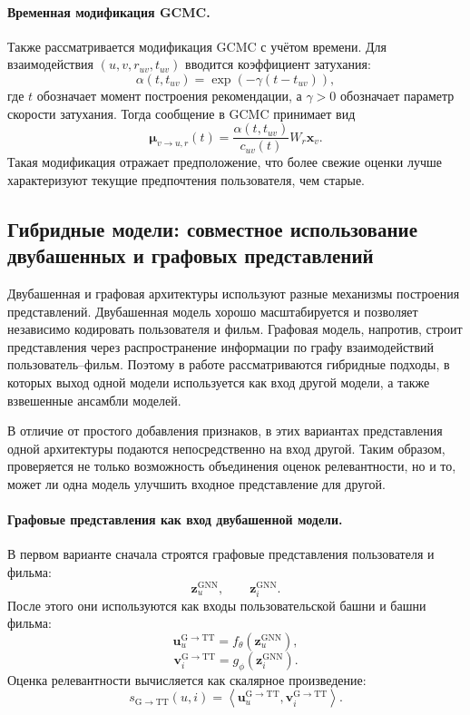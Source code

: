 \documentclass[12pt,fleqn]{article}
\begin{document}
\paragraph{Временная модификация GCMC.}

Также рассматривается модификация GCMC с учётом времени. Для взаимодействия
$(u,v,r_{uv},t_{uv})$ вводится коэффициент затухания:
$$
    \alpha(t,t_{uv})=
    \exp\left(
        -\gamma(t-t_{uv})
    \right),
$$
где $t$ обозначает момент построения рекомендации, а $\gamma>0$ обозначает
параметр скорости затухания. Тогда сообщение в GCMC принимает вид
$$
    \boldsymbol{\mu}_{v\to u,r}(t)=
    \frac{
        \alpha(t,t_{uv})
    }{
        c_{uv}(t)
    }
    W_r\mathbf{x}_v.
$$
Такая модификация отражает предположение, что более свежие оценки лучше
характеризуют текущие предпочтения пользователя, чем старые.

\subsection{Гибридные модели: совместное использование двубашенных и графовых представлений}

Двубашенная и графовая архитектуры используют разные механизмы построения
представлений. Двубашенная модель хорошо масштабируется и позволяет независимо
кодировать пользователя и фильм. Графовая модель, напротив, строит
представления через распространение информации по графу взаимодействий
пользователь--фильм. Поэтому в работе рассматриваются гибридные подходы, в
которых выход одной модели используется как вход другой модели, а также взвешенные ансамбли моделей.

В отличие от простого добавления признаков, в этих вариантах представления
одной архитектуры подаются непосредственно на вход другой. Таким образом,
проверяется не только возможность объединения оценок релевантности, но и то, может ли одна
модель улучшить входное представление для другой.

\paragraph{Графовые представления как вход двубашенной модели.}

В первом варианте сначала строятся графовые представления пользователя и фильма:
$$
    \mathbf{z}^{\mathrm{GNN}}_u,
    \qquad
    \mathbf{z}^{\mathrm{GNN}}_i.
$$
После этого они используются как входы пользовательской башни и башни фильма:
$$
    \mathbf{u}^{\mathrm{G\to TT}}_u=
    f_{\theta}
    \left(
        \mathbf{z}^{\mathrm{GNN}}_u
    \right),
$$
$$
    \mathbf{v}^{\mathrm{G\to TT}}_i=
    g_{\phi}
    \left(
        \mathbf{z}^{\mathrm{GNN}}_i
    \right).
$$
Оценка релевантности вычисляется как скалярное произведение:
$$
    s_{\mathrm{G\to TT}}(u,i)=
    \left\langle
        \mathbf{u}^{\mathrm{G\to TT}}_u,
        \mathbf{v}^{\mathrm{G\to TT}}_i
    \right\rangle.
$$
\end{document}
